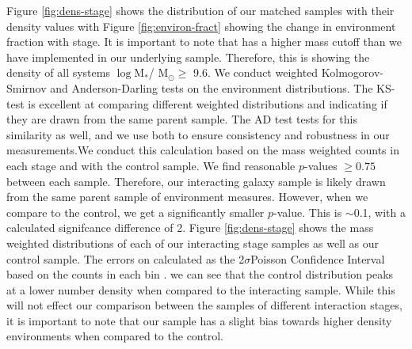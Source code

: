 Figure \ref{fig:dens-stage} shows the distribution of our matched samples with their density values with Figure \ref{fig:environ-fract} showing the change in environment fraction with stage. It is important to note that \citet{2017ApJ...837...16D} has a higher mass cutoff than we have implemented in our underlying sample. Therefore, this is showing the density of all systems $\log$M$_*$/ M$_\odot \geq$ 9.6. We conduct weighted Kolmogorov-Smirnov \citep[KS-test;][]{an1933sulla} and Anderson-Darling \citep[AD-test;][]{stephens_74} tests on the environment distributions. The KS-test is excellent at comparing different weighted distributions and indicating if they are drawn from the same parent sample. The AD test tests for this similarity as well, and we use both to ensure consistency and robustness in our measurements.We conduct this calculation based on the mass weighted counts in each stage and with the control sample. We find reasonable $p$-values $\geq0.75$ between each sample. Therefore, our interacting galaxy sample is likely drawn from the same parent sample of environment measures. However, when we compare to the control, we get a significantly smaller $p$-value. This is $\sim$0.1, with a calculated signifcance difference of 2. Figure \ref{fig:dens-stage} shows the mass weighted distributions of each of our interacting stage samples as well as our control sample. The errors on calculated as the 2$\sigma$Poisson Confidence Interval based on the counts in each bin \citep{1986ApJ...303..336G}. we can see that the control distribution peaks at a lower number density when compared to the interacting sample. While this will not effect our comparison between the samples of different interaction stages, it is important to note that our sample has a slight bias towards higher density environments when compared to the control.

